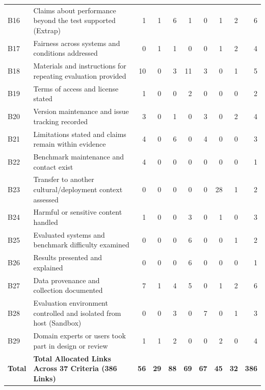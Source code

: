 \documentclass[runningheads]{llncs}
\begin{document}
\begin{table}[t]
{\begin{tabular}{@{}llrrrrrrrr@{}}
B16 & Claims about performance beyond the test supported (Extrap) & 1 & 1 & 6 & 1 & 0 & 1 & 2 & 6 \\
B17 & Fairness across systems and conditions addressed & 0 & 1 & 1 & 0 & 0 & 1 & 2 & 4 \\
B18 & Materials and instructions for repeating evaluation provided & 10 & 0 & 3 & 11 & 3 & 0 & 1 & 5 \\
B19 & Terms of access and license stated & 1 & 0 & 0 & 2 & 0 & 0 & 0 & 2 \\
B20 & Version maintenance and issue tracking recorded & 3 & 0 & 1 & 0 & 3 & 0 & 2 & 4 \\
B21 & Limitations stated and claims remain within evidence & 4 & 0 & 6 & 0 & 4 & 0 & 0 & 3 \\
B22 & Benchmark maintenance and contact exist & 4 & 0 & 0 & 0 & 0 & 0 & 0 & 1 \\
B23 & Transfer to another cultural/deployment context assessed & 0 & 0 & 0 & 0 & 0 & 28 & 1 & 2 \\
B24 & Harmful or sensitive content handled & 1 & 0 & 0 & 3 & 0 & 1 & 0 & 3 \\
B25 & Evaluated systems and benchmark difficulty examined & 0 & 0 & 0 & 6 & 0 & 0 & 1 & 2 \\
B26 & Results presented and explained & 0 & 0 & 0 & 6 & 0 & 0 & 0 & 1 \\
B27 & Data provenance and collection documented & 7 & 1 & 4 & 5 & 0 & 1 & 2 & 6 \\
B28 & Evaluation environment controlled and isolated from host (Sandbox) & 0 & 0 & 3 & 0 & 7 & 0 & 1 & 3 \\
B29 & Domain experts or users took part in design or review & 1 & 1 & 2 & 0 & 0 & 2 & 0 & 4 \\
\midrule
\textbf{Total} & \textbf{Total Allocated Links Across 37 Criteria (386 Links)} & \textbf{56} & \textbf{29} & \textbf{88} & \textbf{69} & \textbf{67} & \textbf{45} & \textbf{32} & \textbf{386} \\
\bottomrule
\end{tabular}%
}
\end{table}
\end{document}
